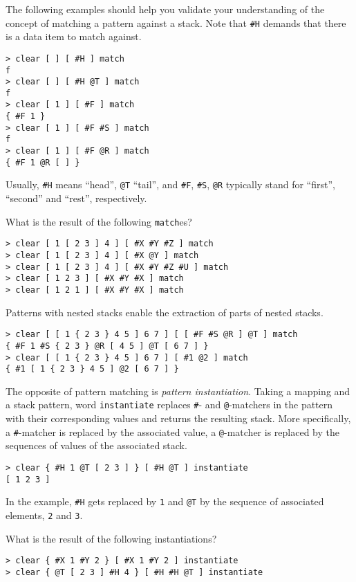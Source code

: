 The following examples should help you validate your understanding of the concept of matching a pattern against a stack. Note that \verb|#H| demands that there is a data item to match against.

\begin{verbatim}
> clear [ ] [ #H ] match
f
> clear [ ] [ #H @T ] match
f
> clear [ 1 ] [ #F ] match
{ #F 1 }
> clear [ 1 ] [ #F #S ] match
f
> clear [ 1 ] [ #F @R ] match
{ #F 1 @R [ ] }
\end{verbatim}

Usually, \verb|#H| means ``head'', \verb|@T| ``tail'', and \verb|#F|, \verb|#S|, \verb|@R| typically stand for ``first'', ``second'' and ``rest'', respectively.

\begin{exercise}\label{ex:match}
What is the result of the following \verb|match|es?
\begin{verbatim}
> clear [ 1 [ 2 3 ] 4 ] [ #X #Y #Z ] match
> clear [ 1 [ 2 3 ] 4 ] [ #X @Y ] match
> clear [ 1 [ 2 3 ] 4 ] [ #X #Y #Z #U ] match
> clear [ 1 2 3 ] [ #X #Y #X ] match
> clear [ 1 2 1 ] [ #X #Y #X ] match
\end{verbatim}
\end{exercise}

Patterns with nested stacks enable the extraction of parts of nested stacks.

\begin{verbatim}
> clear [ [ 1 { 2 3 } 4 5 ] 6 7 ] [ [ #F #S @R ] @T ] match
{ #F 1 #S { 2 3 } @R [ 4 5 ] @T [ 6 7 ] }
> clear [ [ 1 { 2 3 } 4 5 ] 6 7 ] [ #1 @2 ] match
{ #1 [ 1 { 2 3 } 4 5 ] @2 [ 6 7 ] }
\end{verbatim}

The opposite of pattern matching is \emph{pattern instantiation}. Taking a mapping and a stack pattern, word \verb|instantiate| replaces \verb|#|- and \verb|@|-matchers in the pattern with their corresponding values and returns the resulting stack. More specifically, a \verb|#|-matcher is replaced by the associated value, a \verb|@|-matcher is replaced by the sequences of values of the associated stack.

\begin{verbatim}
> clear { #H 1 @T [ 2 3 ] } [ #H @T ] instantiate
[ 1 2 3 ]
\end{verbatim}

In the example, \verb|#H| gets replaced by \verb|1| and \verb|@T| by the sequence of associated elements, \verb|2| and \verb|3|.

\begin{exercise}\label{Ex:instantiate}
What is the result of the following instantiations?
\begin{verbatim}
> clear { #X 1 #Y 2 } [ #X 1 #Y 2 ] instantiate
> clear { @T [ 2 3 ] #H 4 } [ #H #H @T ] instantiate
\end{verbatim}
\end{exercise}

